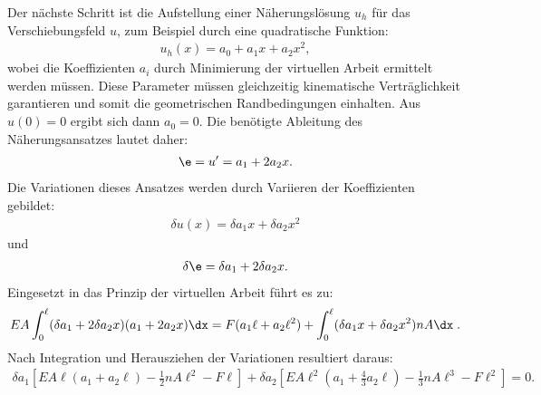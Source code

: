 \documentclass[letterpaper,10pt,german]{jupyterBook}
\begin{document}
\sphinxAtStartPar
Der nächste Schritt ist die Aufstellung einer Näherungslösung \(u_h\) für das Verschiebungsfeld \(u\), zum Beispiel durch eine quadratische Funktion:
\begin{equation*}
\begin{split}u_h(x) = a_0 + a_1 x + a_2 x^2,\end{split}
\end{equation*}
\sphinxAtStartPar
wobei die Koeffizienten \(a_i\) durch Minimierung der virtuellen Arbeit ermittelt werden müssen. Diese Parameter müssen gleichzeitig kinematische Verträglichkeit garantieren und somit die geometrischen Randbedingungen einhalten. Aus \(u(0) = 0\) ergibt sich dann \(a_0 = 0\). Die benötigte Ableitung des Näherungsansatzes lautet daher:
\begin{equation*}
\begin{split}\e = u^{\prime} = a_1 + 2a_2 x.\end{split}
\end{equation*}
\sphinxAtStartPar
Die Variationen dieses Ansatzes werden durch Variieren der Koeffizienten gebildet:
\begin{equation*}
\begin{split}\delta u(x) = \delta a_1 x + \delta a_2 x^2\end{split}
\end{equation*}
\sphinxAtStartPar
und
\begin{equation*}
\begin{split}\delta \e= \delta a_1 + 2 \delta a_2 x.\end{split}
\end{equation*}
\sphinxAtStartPar
Eingesetzt in das Prinzip der virtuellen Arbeit führt es zu:
\begin{equation*}
\begin{split}EA \int_0^{\ell} (\delta a_1 + 2 \delta a_2 x) (a_1 +2 a_2 x) \dx = F (a_1 \ell +a_2 \ell^2) + \int_0^{\ell} (\delta a_1 x + \delta a_2 x^2) n A \dx \; .\end{split}
\end{equation*}
\sphinxAtStartPar
Nach Integration und Herausziehen der Variationen resultiert daraus:
\begin{equation*}
\begin{split}\delta a_1\left[EA \ell (a_1 + a_2 \ell) - \frac{1}{2} n A \ell^2 - F \ell\right] + \delta a_2 \left[EA\ell^2(a_1 + \frac{4}{3}a_2\ell) - \frac{1}{3}nA\ell^3 - F\ell^2\right] = 0.\end{split}
\end{equation*}
\end{document}
